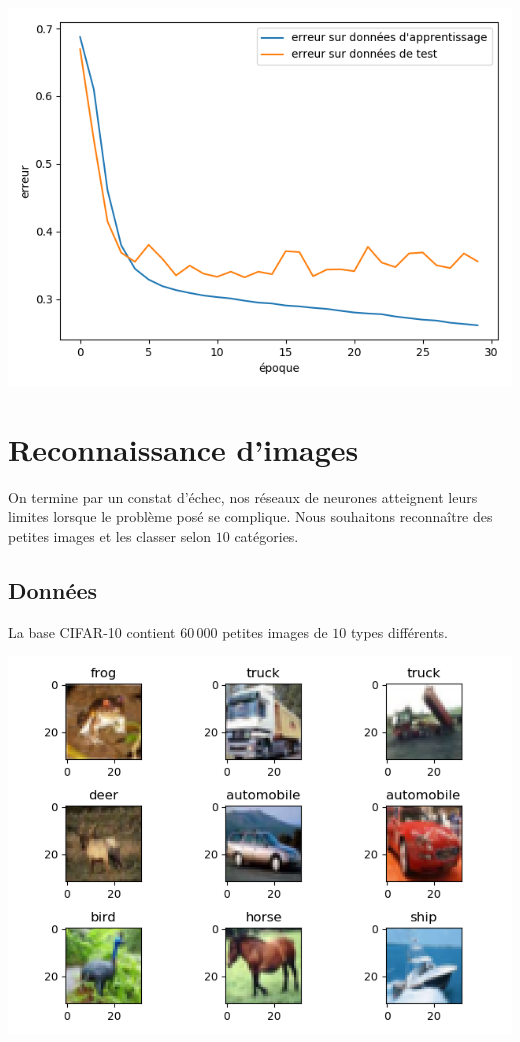 \documentclass[11pt,class=report,crop=false]{standalone}
\begin{document}
\begin{center}
\includegraphics[scale=\myscale,scale=0.5]{figures/tf2-texte-overfit-loss}
\end{center}


\section{Reconnaissance d'images}

On termine par un constat d'échec, nos réseaux de neurones atteignent leurs limites lorsque le problème posé se complique. Nous souhaitons reconnaître des petites images et les classer selon $10$ catégories.

\subsection{Données}

La base CIFAR-10 contient $60\,000$ petites images de $10$ types différents.
\begin{center}
\includegraphics[scale=\myscale,scale=0.7]{figures/tf2-images-train}
\end{center}
\end{document}
